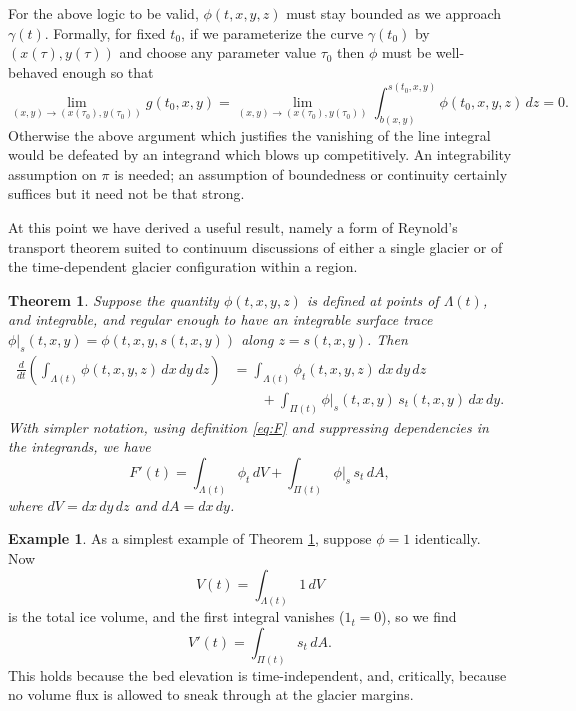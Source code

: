 \documentclass[11pt]{amsart}
\newtheorem{thm}{Theorem}
\theoremstyle{definition}
\newtheorem{ex*}{Example}
\begin{document}
For the above logic to be valid, $\phi(t,x,y,z)$ must stay bounded as we approach $\gamma(t)$.  Formally, for fixed $t_0$, if we parameterize the curve $\gamma(t_0)$ by $(x(\tau), y(\tau))$ and choose any parameter value $\tau_0$ then $\phi$ must be well-behaved enough so that
    $$\lim_{(x,y) \to (x(\tau_0), y(\tau_0))} g(t_0,x,y) = \lim_{(x,y) \to (x(\tau_0), y(\tau_0))} \int_{b(x,y)}^{s(t_0,x,y)} \phi(t_0,x,y,z) \, dz = 0.$$
Otherwise the above argument which justifies the vanishing of the line integral would be defeated by an integrand which blows up competitively.  An integrability assumption on $\pi$ is needed; an assumption of boundedness or continuity certainly suffices but it need not be that strong.

At this point we have derived a useful result, namely a form of Reynold's transport theorem \cite{Holmes2019} suited to continuum discussions of either a single glacier or of the time-dependent glacier configuration within a region.

\begin{thm}  \label{thm:newreynolds}  Suppose the quantity $\phi(t,x,y,z)$ is defined at points of $\Lambda(t)$, and integrable, and regular enough to have an integrable surface trace $\phi|_s(t,x,y) = \phi(t,x,y,s(t,x,y))$ along $z=s(t,x,y)$.  Then
\begin{align*}
\frac{d}{dt}\left(\int_{\Lambda(t)} \phi(t,x,y,z)\,dx\,dy\,dz\right) &= \int_{\Lambda(t)} \phi_t(t,x,y,z)\,dx\,dy\,dz \\
   &\qquad + \int_{\Pi(t)} \phi|_s(t,x,y)\, s_t(t,x,y)\,dx\,dy.
\end{align*}
With simpler notation, using definition \eqref{eq:F} and suppressing dependencies in the integrands, we have
\begin{equation}
F'(t) = \int_{\Lambda(t)} \phi_t\,dV + \int_{\Pi(t)} \phi|_s \, s_t\,dA, \label{eq:newreynolds}
\end{equation}
where $dV=dx\,dy\,dz$ and $dA=dx\,dy$.
\end{thm}

\begin{ex*}  As a simplest example of Theorem \ref{thm:newreynolds}, suppose $\phi=1$ identically.  Now
\begin{equation}
V(t) = \int_{\Lambda(t)} 1\,dV \label{eq:V}
\end{equation}
is the total ice volume, and the first integral vanishes ($1_t=0$), so we find
\begin{equation}
V'(t) = \int_{\Pi(t)} s_t\,dA. \label{eq:dVdt}
\end{equation}
This holds because the bed elevation is time-independent, and, critically, because no volume flux is allowed to sneak through at the glacier margins.
\end{ex*}
\end{document}

